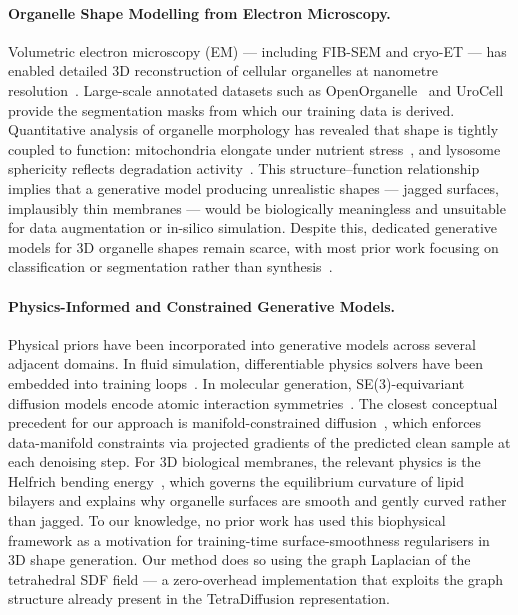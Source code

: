 \documentclass[10pt, a4paper, twocolumn]{article}
\begin{document}
\paragraph{Organelle Shape Modelling from Electron Microscopy.}
Volumetric electron microscopy (EM) — including FIB-SEM and cryo-ET — has enabled detailed 3D reconstruction of cellular organelles at nanometre resolution~\cite{heinrich2021whole}. Large-scale annotated datasets such as OpenOrganelle~\cite{heinrich2021whole} and UroCell~\cite{matuszewski2020urocell} provide the segmentation masks from which our training data is derived. Quantitative analysis of organelle morphology has revealed that shape is tightly coupled to function: mitochondria elongate under nutrient stress~\cite{liesa2013mitochondrial}, and lysosome sphericity reflects degradation activity~\cite{ballabio2020awesome}. This structure--function relationship implies that a generative model producing unrealistic shapes — jagged surfaces, implausibly thin membranes — would be biologically meaningless and unsuitable for data augmentation or in-silico simulation. Despite this, dedicated generative models for 3D organelle shapes remain scarce, with most prior work focusing on classification or segmentation rather than synthesis~\cite{ronneberger2015u}.

\paragraph{Physics-Informed and Constrained Generative Models.}
Physical priors have been incorporated into generative models across several adjacent domains. In fluid simulation, differentiable physics solvers have been embedded into training loops~\cite{um2020solver}. In molecular generation, SE(3)-equivariant diffusion models encode atomic interaction symmetries~\cite{hoogeboom2022equivariant}. The closest conceptual precedent for our approach is manifold-constrained diffusion~\cite{chung2022diffusion}, which enforces data-manifold constraints via projected gradients of the predicted clean sample at each denoising step. For 3D biological membranes, the relevant physics is the Helfrich bending energy~\cite{helfrich1973elastic}, which governs the equilibrium curvature of lipid bilayers and explains why organelle surfaces are smooth and gently curved rather than jagged. To our knowledge, no prior work has used this biophysical framework as a motivation for training-time surface-smoothness regularisers in 3D shape generation. Our method does so using the graph Laplacian of the tetrahedral SDF field — a zero-overhead implementation that exploits the graph structure already present in the TetraDiffusion representation.
\end{document}
